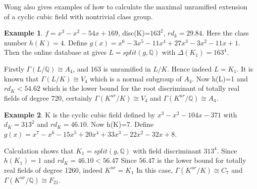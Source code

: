 \documentclass[12pt]{extarticle}
\newcommand{\Q}{\mathbb{Q}}
\newcommand{\<}{\langle}
\renewcommand{\>}{\rangle}
\theoremstyle{definition}
\newtheorem{example}{Example}
\begin{document}
Wong also gives examples of how to calculate the maximal unramified extension of a cyclic cubic field with nontrivial class group. \begin{example}
    $f=x^3-x^2-54x+169$, disc(K)=$163^2$, $rd_{k}=29.84$. Here 
     the class number $h(K)=4$. Define $g(x)=x^6-3x^5-11x^4+27x^3-3x^2-11x+1$. Then the online database at \cite{JONE2} gives $L = split(g,\Q)$ with $\Delta(K_1)=163^4$. \par

     Firstly $\Gamma(L/\Q) \cong A_4$, and 163 is unramified in $L/K$. Hence indeed $L=K_1$. It is known that $\Gamma(L/K)\cong V_4$ which is a normal subgroup of $A_4$. Now h(L)=1 and $rd_K < 54.62$ which is the lower bound for the root discriminant of totally real fields of degree 720, certainly $\Gamma(K^{ur}/K) \cong V_4$ and $\Gamma(K^{ur}/\Q) \cong A_4$. 
\end{example}
\begin{example}
K is the cyclic cubic field defined by $x^3-x^2-104x-371$ with $d_K = 313^2$
and $rd_{K} = 46.10$. Now h(K)=7. Define $g(x) = x^7-x^6-15x^5+20x^4+33x^3-22x^2-32x+8$. \par
Calculation shows that $K_1=split(g,\Q)$ with field discriminant $313^4$. Since $h(K_1) = 1$ and $rd_K = 46.10 < 56.47$ Since $56.47$ is the lower
bound for totally real fields of degree $1260$, indeed $K^{ur}=K_1$ In this
case, $\Gamma(K^{ur}/K) \cong C_7$ and $\Gamma(K^{ur}/\Q) \cong F_{21} $.  
\end{example}


% 

\end{document}

